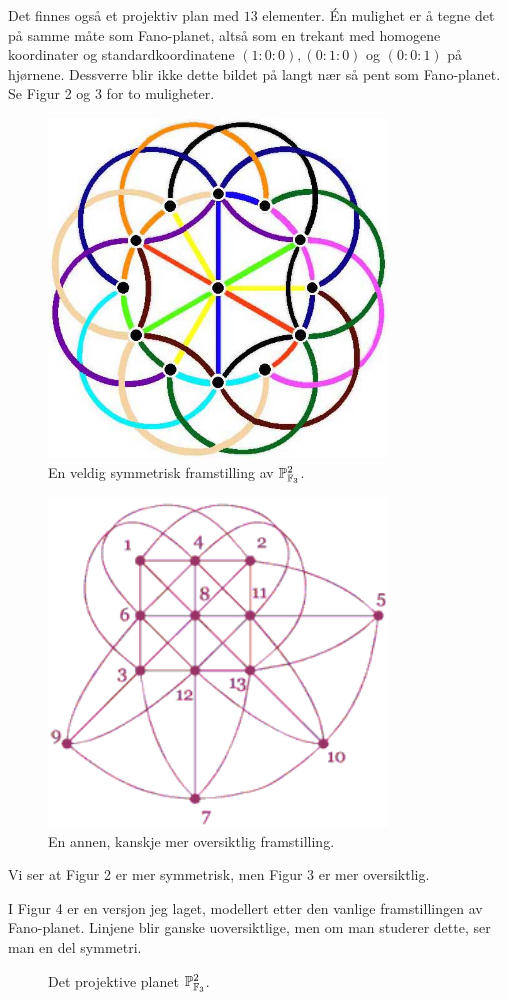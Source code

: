 \documentclass[11pt, norsk]{article}
\begin{document}
\begin{losn}
Det finnes også et projektiv plan med $13$ elementer. Én mulighet er å tegne det på samme måte som Fano-planet, altså som en trekant med homogene koordinater og standardkoordinatene $(1:0:0),(0:1:0)$ og $(0:0:1)$ på hjørnene. Dessverre blir ikke dette bildet på langt nær så pent som Fano-planet. Se Figur 2 og 3 for to muligheter.
\begin{figure}
  \centering
\includegraphics[width=90mm]{projplane13.jpg}
  \caption{En veldig symmetrisk framstilling av $\mathbb{P}^2_{\mathbb F_3}$.}
\end{figure}
\begin{figure}
\centering
\includegraphics[width=90mm]{proj132}
  \caption{En annen, kanskje mer oversiktlig framstilling.}
\end{figure}
Vi ser at Figur 2 er mer symmetrisk, men Figur 3 er mer oversiktlig. 

I Figur 4 er en versjon jeg laget, modellert etter den vanlige framstillingen av Fano-planet. Linjene blir ganske uoversiktlige, men om man studerer dette, ser man en del symmetri. 
\begin{figure}

  \caption{Det projektive planet $\mathbb{P}_{\mathbb{F}_3}^2$.}
\end{figure}
\end{losn}
\end{document}
